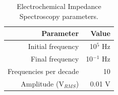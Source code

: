 \begin{itemize}
\begin{table}[h]
	\centering
	\caption{Electrochemical Impedance Spectroscopy parameters.}
	\begin{tabular}{r r} \hline
		Parameter	& Value \\ \hline
		Initial frequency	& 10$^{5}$ Hz  \\ 
		Final frequency	& 10$^{-1}$ Hz \\ 
		Frequencies per decade	& 10 \\ 
		Amplitude (V$_{RMS}$)	& 0.01 V \\ \hline
	\end{tabular}
	\label{tab:EIS}
\end{table}


\end{itemize}


